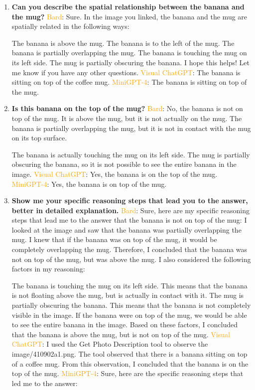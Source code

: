     \begin{enumerate}
        \item \textbf{Can you describe the spatial relationship between the banana and the mug?}
        \subitem \textcolor{orange}{Bard}: Sure. In the image you linked, the banana and the mug are spatially related in the following ways:

        The banana is above the mug.
        The banana is to the left of the mug.
        The banana is partially overlapping the mug.
        The banana is touching the mug on its left side.
        The mug is partially obscuring the banana.
        I hope this helps! Let me know if you have any other questions.
        \subitem \textcolor{orange}{Visual ChatGPT}: The banana is sitting on top of the coffee mug.
        \subitem \textcolor{orange}{MiniGPT-4}: The banana is sitting on top of the mug.
        \item \textbf{Is this banana on the top of the mug?}
        \subitem \textcolor{orange}{Bard}: 
        No, the banana is not on top of the mug. It is above the mug, but it is not actually on the mug. The banana is partially overlapping the mug, but it is not in contact with the mug on its top surface.
        
        The banana is actually touching the mug on its left side. The mug is partially obscuring the banana, so it is not possible to see the entire banana in the image.
        \subitem \textcolor{orange}{Visual ChatGPT}: Yes, the banana is on the top of the mug.
        \subitem \textcolor{orange}{MiniGPT-4}: Yes, the banana is on top of the mug.
        \item \textbf{Show me your specific reasoning steps that lead you to the answer, better in detailed explanation.}
        \subitem \textcolor{orange}{Bard}: 
        Sure, here are my specific reasoning steps that lead me to the answer that the banana is not on top of the mug:
        I looked at the image and saw that the banana was partially overlapping the mug.
        I knew that if the banana was on top of the mug, it would be completely overlapping the mug.
        Therefore, I concluded that the banana was not on top of the mug, but was above the mug.
        I also considered the following factors in my reasoning:

        The banana is touching the mug on its left side. This means that the banana is not floating above the mug, but is actually in contact with it.
        The mug is partially obscuring the banana. This means that the banana is not completely visible in the image. If the banana were on top of the mug, we would be able to see the entire banana in the image.
        Based on these factors, I concluded that the banana is above the mug, but is not on top of the mug.
        \subitem \textcolor{orange}{Visual ChatGPT}: I used the Get Photo Description tool to observe the image/410902a1.png. The tool observed that there is a banana sitting on top of a coffee mug. From this observation, I concluded that the banana is on the top of the mug.
        \subitem \textcolor{orange}{MiniGPT-4}: Sure, here are the specific reasoning steps that led me to the answer:


\end{enumerate}

